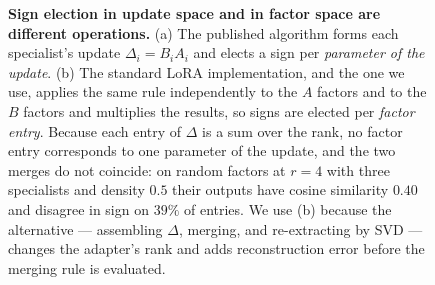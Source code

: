 \begin{figure}[t]
\caption{\textbf{Sign election in update space and in factor space are different operations.}
(a) The published algorithm forms each specialist's update $\Delta_i = B_iA_i$ and elects a sign per
\emph{parameter of the update}. (b) The standard LoRA implementation, and the one we use, applies the
same rule independently to the $A$ factors and to the $B$ factors and multiplies the results, so signs
are elected per \emph{factor entry}. Because each entry of $\Delta$ is a sum over the rank, no factor
entry corresponds to one parameter of the update, and the two merges do not coincide: on random
factors at $r{=}4$ with three specialists and density $0.5$ their outputs have cosine similarity
$0.40$ and disagree in sign on $39\%$ of entries. We use (b) because the alternative --- assembling
$\Delta$, merging, and re-extracting by SVD --- changes the adapter's rank and adds reconstruction
error before the merging rule is evaluated.}
\label{fig:factorspace}
\end{figure}


